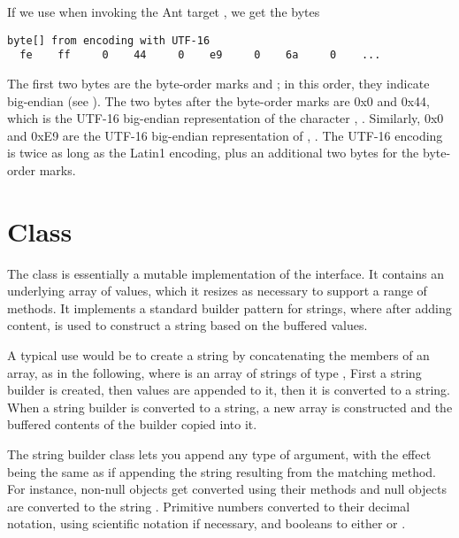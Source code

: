 If we use  when invoking the Ant target
, we get the bytes
%
\begin{verbatim}
byte[] from encoding with UTF-16
  fe    ff     0    44     0    e9     0    6a     0    ...
\end{verbatim}
%
The first two bytes are the byte-order marks  and
; in this order, they indicate big-endian 
(see ).  The two bytes after the byte-order
marks are 0x0 and 0x44, which is the UTF-16 big-endian representation
of the character , .
Similarly, 0x0 and 0xE9 are the UTF-16 big-endian representation of
, .  The
UTF-16 encoding is twice as long as the Latin1 encoding, plus an
additional two bytes for the byte-order marks.


\section{ Class}

The  class is essentially a mutable implementation
of the  interface.  It contains an underlying array
of  values, which it resizes as necessary to support a
range of  methods.  It implements a standard
builder pattern for strings, where after adding content, 
is used to construct a string based on the buffered values.

A typical use would be to create a string by concatenating the members
of an array, as in the following, where  is an array of
strings of type ,
%
%
First a string builder is created, then values are appended to it,
then it is converted to a string.  When a string builder is converted
to a string, a new array is constructed and the buffered contents of
the builder copied into it.

The string builder class lets you append any type of argument, with
the effect being the same as if appending the string resulting from
the matching  method.  For instance, non-null
objects get converted using their  methods and null
objects are converted to the string .  Primitive
numbers converted to their decimal notation, using scientific notation
if necessary, and booleans to either  or
.

